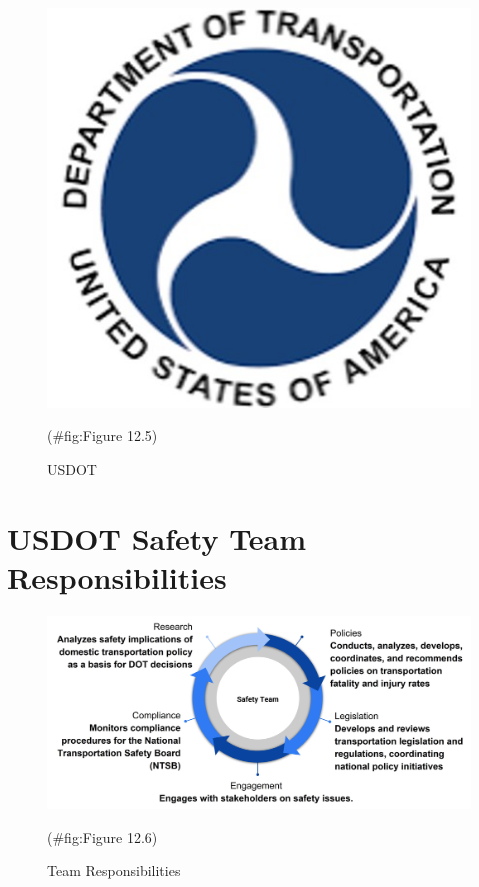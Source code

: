 \documentclass[
]{book}
\begin{document}
\begin{figure}

{\centering \includegraphics{./Images/Research organizations/USDOT} 

}

\caption{USDOT}(\#fig:Figure 12.5)
\end{figure}

\hypertarget{organization-usdotsafety}{%
\section{USDOT Safety Team Responsibilities}\label{organization-usdotsafety}}

\begin{figure}

{\centering \includegraphics{./Images/Research organizations/Team Responsibilities} 

}

\caption{Team Responsibilities}(\#fig:Figure 12.6)
\end{figure}
\end{document}
